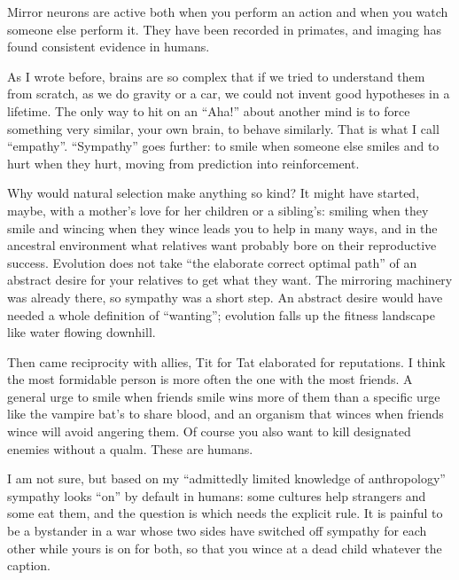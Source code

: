 
Mirror neurons are active both when you perform an action and when you watch someone else perform it. They have been recorded in primates, and imaging has found consistent evidence in humans. 

As I wrote before, brains are so complex that if we tried to understand them from scratch, as we do gravity or a car, we could not invent good hypotheses in a lifetime. The only way to hit on an ``Aha!'' about another mind is to force something very similar, your own brain, to behave similarly. That is what I call ``empathy''. ``Sympathy'' goes further: to smile when someone else smiles and to hurt when they hurt, moving from prediction into reinforcement. 

Why would natural selection make anything so kind? It might have started, maybe, with a mother's love for her children or a sibling's: smiling when they smile and wincing when they wince leads you to help in many ways, and in the ancestral environment what relatives want probably bore on their reproductive success. Evolution does not take ``the elaborate correct optimal path'' of an abstract desire for your relatives to get what they want. The mirroring machinery was already there, so sympathy was a short step. An abstract desire would have needed a whole definition of ``wanting''; evolution falls up the fitness landscape like water flowing downhill.

Then came reciprocity with allies, Tit for Tat elaborated for reputations. I think the most formidable person is more often the one with the most friends. A general urge to smile when friends smile wins more of them than a specific urge like the vampire bat's to share blood, and an organism that winces when friends wince will avoid angering them. Of course you also want to kill designated enemies without a qualm. These are humans. 

I am not sure, but based on my ``admittedly limited knowledge of anthropology'' sympathy looks ``on'' by default in humans: some cultures help strangers and some eat them, and the question is which needs the explicit rule. It is painful to be a bystander in a war whose two sides have switched off sympathy for each other while yours is on for both, so that you wince at a dead child whatever the caption.

